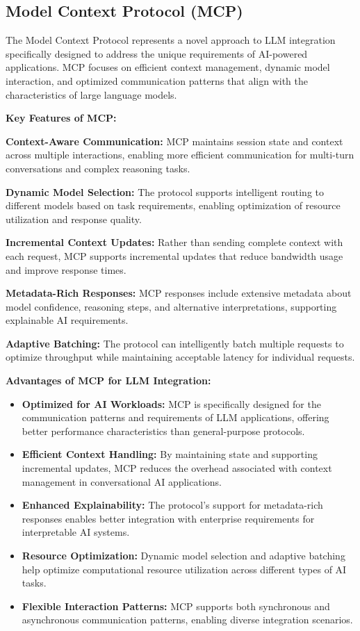 \subsection{Model Context Protocol (MCP)}

The Model Context Protocol represents a novel approach to LLM integration specifically designed to address the unique requirements of AI-powered applications. MCP focuses on efficient context management, dynamic model interaction, and optimized communication patterns that align with the characteristics of large language models.

\textbf{Key Features of MCP:}

\textbf{Context-Aware Communication:} MCP maintains session state and context across multiple interactions, enabling more efficient communication for multi-turn conversations and complex reasoning tasks.

\textbf{Dynamic Model Selection:} The protocol supports intelligent routing to different models based on task requirements, enabling optimization of resource utilization and response quality.

\textbf{Incremental Context Updates:} Rather than sending complete context with each request, MCP supports incremental updates that reduce bandwidth usage and improve response times.

\textbf{Metadata-Rich Responses:} MCP responses include extensive metadata about model confidence, reasoning steps, and alternative interpretations, supporting explainable AI requirements.

\textbf{Adaptive Batching:} The protocol can intelligently batch multiple requests to optimize throughput while maintaining acceptable latency for individual requests.

\textbf{Advantages of MCP for LLM Integration:}

\begin{itemize}
    \item \textbf{Optimized for AI Workloads:} MCP is specifically designed for the communication patterns and requirements of LLM applications, offering better performance characteristics than general-purpose protocols.
    \item \textbf{Efficient Context Handling:} By maintaining state and supporting incremental updates, MCP reduces the overhead associated with context management in conversational AI applications.
    \item \textbf{Enhanced Explainability:} The protocol's support for metadata-rich responses enables better integration with enterprise requirements for interpretable AI systems.
    \item \textbf{Resource Optimization:} Dynamic model selection and adaptive batching help optimize computational resource utilization across different types of AI tasks.
    \item \textbf{Flexible Interaction Patterns:} MCP supports both synchronous and asynchronous communication patterns, enabling diverse integration scenarios.
\end{itemize}

